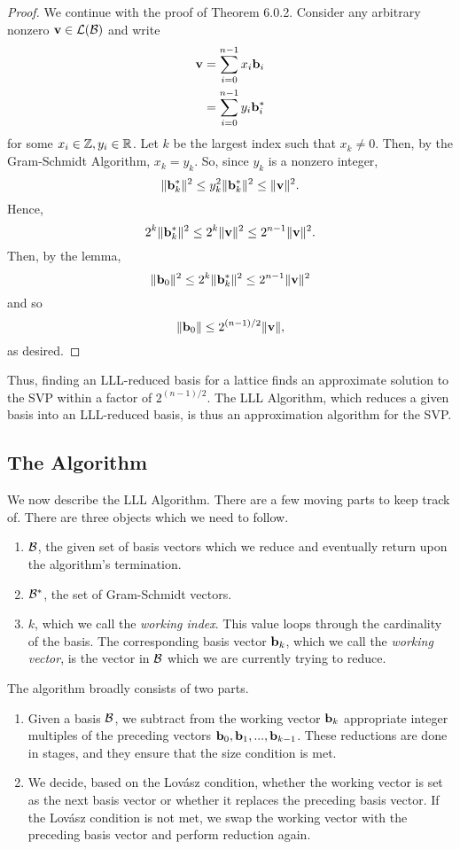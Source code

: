 \documentclass[a4paper,12pt]{article}
\begin{document}
\begin{proof}
We continue with the proof of Theorem 6.0.2. Consider any arbitrary nonzero $\mathbf{v} \in \mathcal{L}(\mathcal{B})$ and write \begin{align*}
    \mathbf{v} &= \sum_{i=0}^{n-1}x_{i}\mathbf{b}_{i}\\
    &= \sum_{i=0}^{n-1}y_{i}\mathbf{b}_{i}^*
\end{align*} for some $x_i \in \mathbb{Z}, y_i \in \mathbb{R}$. Let $k$ be the largest index such that $x_k \neq 0$. Then, by the Gram-Schmidt Algorithm, $x_k = y_k$. So, since $y_k$ is a nonzero integer, $$\|\mathbf{b}_{k}^{*}\|^2 \leq y_{k}^{2}\|\mathbf{b}_{k}^{*}\|^2 \leq \|\mathbf{v}\|^{2}.$$ Hence, $$2^{k}\|\mathbf{b}_{k}^{*}\|^2 \leq 2^{k}\|\mathbf{v}\|^2 \leq 2^{n-1}\|\mathbf{v}\|^2.$$ Then, by the lemma, $$\|\mathbf{b}_0\|^2 \leq 2^{k}\|\mathbf{b}_{k}^{*}\|^2 \leq 2^{n-1}\|\mathbf{v}\|^2$$ and so $$\|\mathbf{b}_0\| \leq 2^{(n-1)/2}\|\mathbf{v}\|,$$ as desired.
\end{proof}

Thus, finding an LLL-reduced basis for a lattice finds an approximate solution to the SVP within a factor of $2^{(n-1)/2}$. The LLL Algorithm, which reduces a given basis into an LLL-reduced basis, is thus an approximation algorithm for the SVP. 

\subsection{The Algorithm}
We now describe the LLL Algorithm. There are a few moving parts to keep track of. There are three objects which we need to follow.
\begin{enumerate}
    \item $\mathcal{B}$, the given set of basis vectors which we reduce and eventually return upon the algorithm's termination.
    \item $\mathcal{B}^*$, the set of Gram-Schmidt vectors.
    \item $k$, which we call the \textit{working index}. This value loops through the cardinality of the basis. The corresponding basis vector $\mathbf{b}_k$, which we call the \textit{working vector}, is the vector in $\mathcal{B}$ which we are currently trying to reduce.
    \end{enumerate}

The algorithm broadly consists of two parts. 
\begin{enumerate}
    \item Given a basis $\mathcal{B}$, we subtract from the working vector $\mathbf{b}_k$ appropriate integer multiples of the preceding vectors $\mathbf{b}_0, \mathbf{b}_1, ..., \mathbf{b}_{k-1}$. These reductions are done in stages, and they ensure that the size condition is met.
    \item We decide, based on the Lov\'asz condition, whether the working vector is set as the next basis vector or whether it replaces the preceding basis vector. If the Lov\'asz condition is not met, we swap the working vector with the preceding basis vector and perform reduction again.
\end{enumerate}
\end{document}
